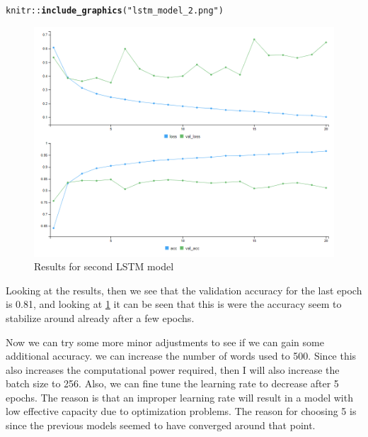 \documentclass[10pt, a4paper, english]{article}\usepackage[]{graphicx}\usepackage[dvipsnames]{xcolor}
\makeatletter
\def\maxwidth{ %
  \ifdim\Gin@nat@width>\linewidth
    \linewidth
  \else
    \Gin@nat@width
  \fi
}
\newcommand{\hlstr}[1]{\textcolor[rgb]{0.192,0.494,0.8}{#1}}%
\newcommand{\hlopt}[1]{\textcolor[rgb]{0,0,0}{#1}}%
\newcommand{\hlstd}[1]{\textcolor[rgb]{0.345,0.345,0.345}{#1}}%
\newcommand{\hlkwd}[1]{\textcolor[rgb]{0.737,0.353,0.396}{\textbf{#1}}}%
\newenvironment{kframe}{%
 \def\at@end@of@kframe{}%
 \ifinner\ifhmode%
  \def\at@end@of@kframe{\end{minipage}}%
  \begin{minipage}{\columnwidth}%
 \fi\fi%
 \def\FrameCommand##1{\hskip\@totalleftmargin \hskip-\fboxsep
 \colorbox{shadecolor}{##1}\hskip-\fboxsep
     \hskip-\linewidth \hskip-\@totalleftmargin \hskip\columnwidth}%
 \MakeFramed {\advance\hsize-\width
   \@totalleftmargin\z@ \linewidth\hsize
   \@setminipage}}%
 {\par\unskip\endMakeFramed%
 \at@end@of@kframe}
\newenvironment{knitrout}{}{} %
\makeatother
\begin{document}
\begin{knitrout}
\color{fgcolor}\begin{kframe}
\begin{alltt}
\hlstd{knitr}\hlopt{::}\hlkwd{include_graphics}\hlstd{(}\hlstr{"lstm_model_2.png"}\hlstd{)}
\end{alltt}
\end{kframe}\begin{figure}
\includegraphics[width=\maxwidth]{lstm_model_2} \caption[Results for second LSTM model]{Results for second LSTM model}\label{fig:lstm_model_2_plot}
\end{figure}

\end{knitrout}
Looking at the results, then we see that the validation accuracy for the last epoch is 0.81, and looking at \ref{fig:lstm_model_2_plot} it can be seen that this is were the accuracy seem to stabilize around already after  a few epochs. 

Now we can try some more minor adjustments to see if we can gain some additional accuracy. we can increase the number of words used to 500. Since this also increases the computational power required, then I will also increase the batch size to 256. Also, we can fine tune the learning rate to decrease after 5 epochs. The reason is that an improper learning rate will result in a model with low effective capacity due to optimization problems. The reason for choosing 5 is since the  previous models seemed to have converged around that point. 
\end{document}
